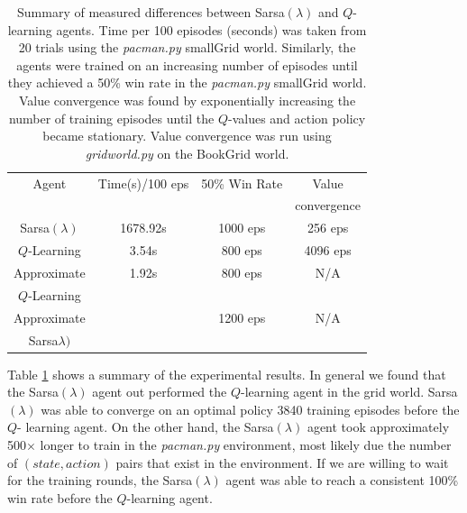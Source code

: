 \documentclass[10pt,conference]{IEEEtran}
\begin{document}
	\begin{table}
		\begin{tabular}{|c|c|c|c|}
			\hline
			Agent & Time(s)/100 eps & 50\% Win Rate & Value \\
			& & & convergence \\
			\hline \hline
			Sarsa\((\lambda)\) & 1678.92s & 1000 eps & 256 eps \\
			\hline
			\(Q\)-Learning & 3.54s & 800 eps & 4096 eps \\
			\hline
			Approximate & 1.92s & 800 eps & N/A \\
			\(Q\)-Learning & & & \\
			\hline
			Approximate & & 1200 eps & N/A \\
			Sarsa\(\lambda)\) & & & \\
			\hline
		\end{tabular}
		\caption{Summary of measured differences between Sarsa\((\lambda)\)
		and \(Q\)-learning agents.  Time per 100 episodes (seconds) was 
		taken from 20 trials using the \textit{pacman.py} smallGrid world.  
		Similarly, the agents were trained on an increasing number of episodes until 
		they achieved a 50\% win rate in the \textit{pacman.py} smallGrid 
		world.  Value convergence was found by exponentially increasing 
		the number of training episodes until the \(Q\)-values and 
		action policy became stationary.  Value convergence was run
		using \textit{gridworld.py} on the BookGrid world.}
		\label{summary}
	\end{table}
			
	Table \ref{summary} shows a summary of the experimental results.  In 
	general we found that the Sarsa\((\lambda)\) agent out performed the 
	\(Q\)-learning agent in the grid world.  Sarsa\((\lambda)\) was able to 
	converge on an optimal policy 3840 training episodes before the \(Q\)-
	learning agent.  On the other hand, the Sarsa\((\lambda)\) agent took approximately
	500\(\times\) longer to train in the \textit{pacman.py} environment, most 
	likely due the number of \((state, action)\) pairs that exist in the 
	environment.  If we are willing to wait for the training rounds, the 
	Sarsa\((\lambda)\) agent was able to reach a consistent 100\% win rate before
	the \(Q\)-learning agent. 
\end{document}
